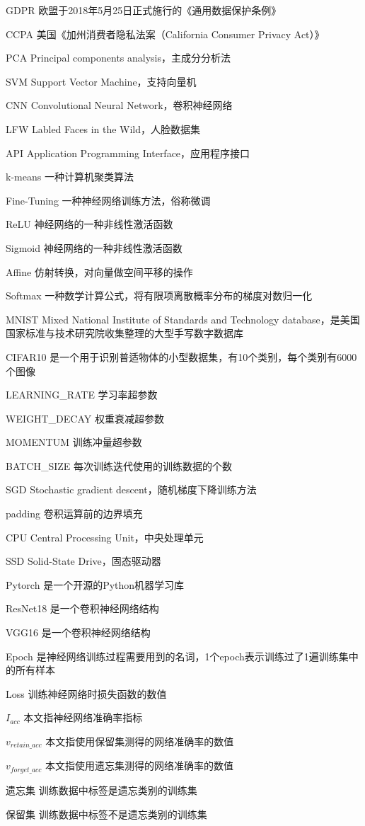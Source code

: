 
\begin{denotation}[3cm]
  \item[GDPR] 欧盟于2018年5月25日正式施行的《通用数据保护条例》
  \item[CCPA] 美国《加州消费者隐私法案（California Consumer Privacy Act）》 
  \item[PCA] Principal components analysis，主成分分析法
  \item[SVM] Support Vector Machine，支持向量机
  \item[CNN] Convolutional Neural Network，卷积神经网络
  \item[LFW] Labled Faces in the Wild，人脸数据集
  \item[API] Application Programming Interface，应用程序接口
  \item[k-means] 一种计算机聚类算法
  \item[Fine-Tuning] 一种神经网络训练方法，俗称微调
  \item[ReLU] 神经网络的一种非线性激活函数
  \item[Sigmoid] 神经网络的一种非线性激活函数
  \item[Affine] 仿射转换，对向量做空间平移的操作
  \item[Softmax] 一种数学计算公式，将有限项离散概率分布的梯度对数归一化
  \item[MNIST] Mixed National Institute of Standards and Technology database，是美国国家标准与技术研究院收集整理的大型手写数字数据库
  \item[CIFAR10] 是一个用于识别普适物体的小型数据集，有10个类别，每个类别有6000个图像
  \item[LEARNING\_RATE] 学习率超参数
  \item[WEIGHT\_DECAY] 权重衰减超参数
  \item[MOMENTUM] 训练冲量超参数  
  \item[BATCH\_SIZE] 每次训练迭代使用的训练数据的个数
  \item[SGD]   Stochastic gradient descent，随机梯度下降训练方法
  \item[padding] 卷积运算前的边界填充
  \item[CPU] Central Processing Unit，中央处理单元
  \item[SSD] Solid-State Drive，固态驱动器
  \item[Pytorch] 是一个开源的Python机器学习库
  \item[ResNet18] 是一个卷积神经网络结构
  \item[VGG16] 是一个卷积神经网络结构
  \item[Epoch] 是神经网络训练过程需要用到的名词，1个epoch表示训练过了1遍训练集中的所有样本
  \item[Loss] 训练神经网络时损失函数的数值
  \item[$I_{acc}$] 本文指神经网络准确率指标
  \item[$v_{retain\_acc}$] 本文指使用保留集测得的网络准确率的数值
  \item[$v_{forget\_acc}$] 本文指使用遗忘集测得的网络准确率的数值
  \item[遗忘集] 训练数据中标签是遗忘类别的训练集 
  \item[保留集]  训练数据中标签不是遗忘类别的训练集
\end{denotation}
